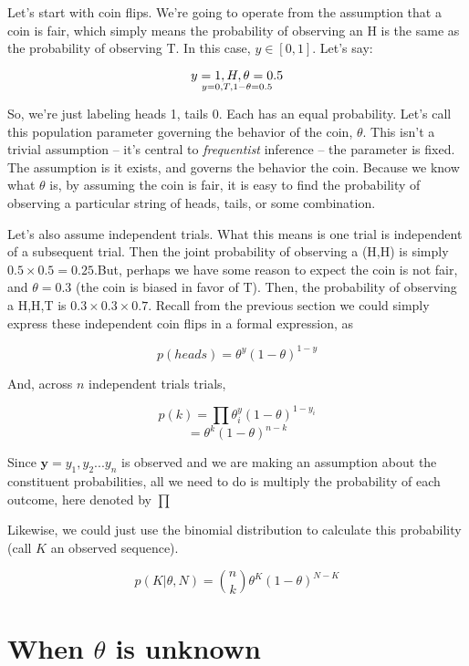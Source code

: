 \documentclass[
]{book}
\begin{document}
Let's start with coin flips. We're going to operate from the assumption that a coin is fair, which simply means the probability of observing an H is the same as the probability of observing T. In this case, \(y \in [0 , 1]\). Let's say:

\[y = {1, H, \theta=0.5}\atop  {y=0, T, 1-\theta=0.5} \]

So, we're just labeling heads 1, tails 0. Each has an equal probability. Let's call this population parameter governing the behavior of the coin, \(\theta\). This isn't a trivial assumption -- it's central to \emph{frequentist} inference -- the parameter is fixed. The assumption is it exists, and governs the behavior the coin. Because we know what \(\theta\) is, by assuming the coin is fair, it is easy to find the probability of observing a particular string of heads, tails, or some combination.

Let's also assume independent trials. What this means is one trial is independent of a subsequent trial. Then the joint probability of observing a (H,H) is simply \(0.5 \times 0.5=0.25\).But, perhaps we have some reason to expect the coin is not fair, and \(\theta=0.3\) (the coin is biased in favor of T). Then, the probability of observing a H,H,T is \(0.3 \times 0.3 \times 0.7\). Recall from the previous section we could simply express these independent coin flips in a formal expression, as

\[p(heads)=\theta^y(1-\theta)^{1-y}\]

And, across \(n\) independent trials trials,

\[p(k)=\prod\theta^y_i(1-\theta)^{1-y_i}\] \[=\theta^k(1-\theta)^{n-k}\]

Since \(\textbf{y}=y_1, y_2...y_n\) is observed and we are making an assumption about the constituent probabilities, all we need to do is multiply the probability of each outcome, here denoted by \(\prod\)

Likewise, we could just use the binomial distribution to calculate this probability (call \(K\) an observed sequence).

\[p(K | \theta, N)= {n \choose k} \theta^K(1-\theta)^{N-K}\]

\section{\texorpdfstring{When \(\theta\) is unknown}{When \textbackslash theta is unknown}}\label{when-theta-is-unknown}
\end{document}
